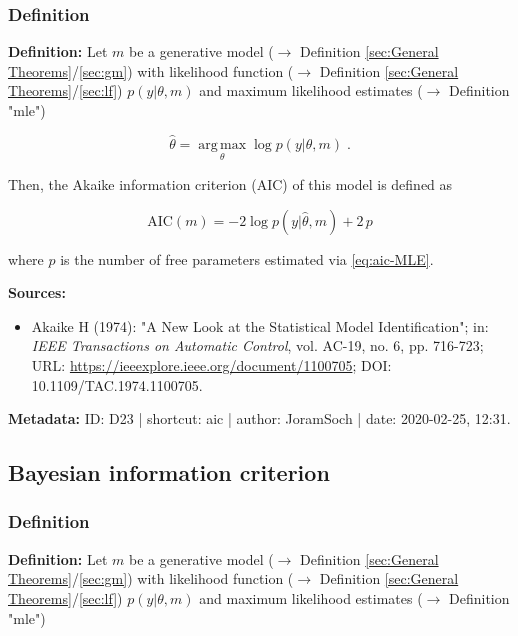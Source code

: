 \documentclass[a4paper,12pt]{book}
\begin{document}
\subsubsection[\textit{Definition}]{Definition} \label{sec:aic}

\vspace{1em}
\textbf{Definition:} Let $m$ be a generative model ($\rightarrow$ Definition \ref{sec:General Theorems}/\ref{sec:gm}) with likelihood function ($\rightarrow$ Definition \ref{sec:General Theorems}/\ref{sec:lf}) $p(y \vert \theta, m)$ and maximum likelihood estimates ($\rightarrow$ Definition "mle")

\begin{equation} \label{eq:aic-MLE}
\hat{\theta} = \operatorname*{arg\,max}_\theta \log p(y | \theta, m) \; .
\end{equation}

Then, the Akaike information criterion (AIC) of this model is defined as

\begin{equation} \label{eq:aic-AIC}
\mathrm{AIC}(m) = -2 \log p(y | \hat{\theta}, m) + 2 \, p
\end{equation}

where $p$ is the number of free parameters estimated via \eqref{eq:aic-MLE}.

\vspace{1em}
\textbf{Sources:}
\begin{itemize}
\item Akaike H (1974): "A New Look at the Statistical Model Identification"; in: \textit{IEEE Transactions on Automatic Control}, vol. AC-19, no. 6, pp. 716-723; URL: \url{https://ieeexplore.ieee.org/document/1100705}; DOI: 10.1109/TAC.1974.1100705.
\end{itemize}


\vspace{1em}
\textbf{Metadata:} ID: D23 | shortcut: aic | author: JoramSoch | date: 2020-02-25, 12:31.


\subsection{Bayesian information criterion}

\subsubsection[\textit{Definition}]{Definition} \label{sec:bic}

\vspace{1em}
\textbf{Definition:} Let $m$ be a generative model ($\rightarrow$ Definition \ref{sec:General Theorems}/\ref{sec:gm}) with likelihood function ($\rightarrow$ Definition \ref{sec:General Theorems}/\ref{sec:lf}) $p(y \vert \theta, m)$ and maximum likelihood estimates ($\rightarrow$ Definition "mle")
\end{document}
